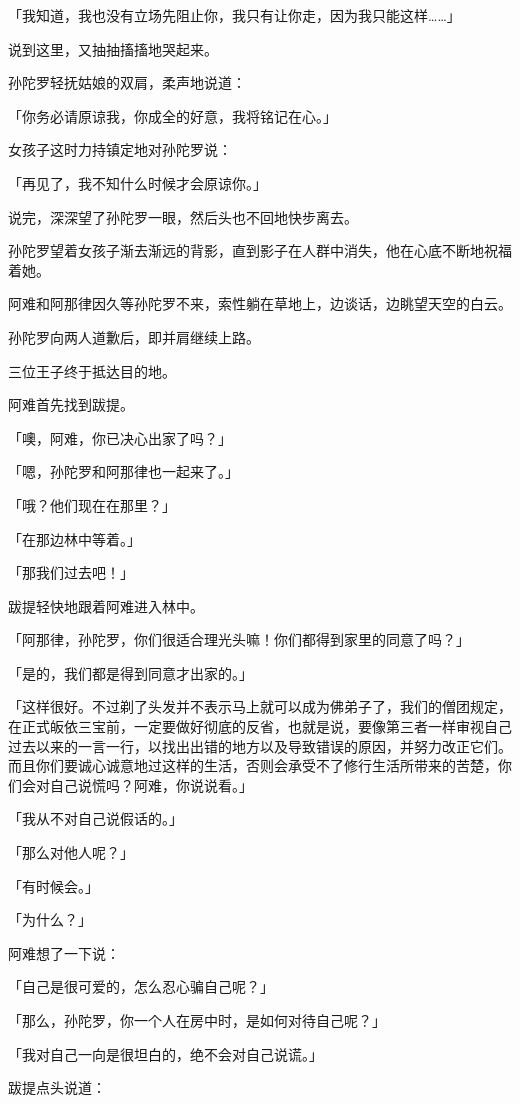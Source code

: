\documentclass[twoside,openany]{book}
\begin{document}
「我知道，我也没有立场先阻止你，我只有让你走，因为我只能这样……」

说到这里，又抽抽搐搐地哭起来。

孙陀罗轻抚姑娘的双肩，柔声地说道：

「你务必请原谅我，你成全的好意，我将铭记在心。」

女孩子这时力持镇定地对孙陀罗说：

「再见了，我不知什么时候才会原谅你。」

说完，深深望了孙陀罗一眼，然后头也不回地快步离去。

孙陀罗望着女孩子渐去渐远的背影，直到影子在人群中消失，他在心底不断地祝福着她。

阿难和阿那律因久等孙陀罗不来，索性躺在草地上，边谈话，边眺望天空的白云。

孙陀罗向两人道歉后，即并肩继续上路。

三位王子终于抵达目的地。

阿难首先找到跋提。

「噢，阿难，你已决心出家了吗？」

「嗯，孙陀罗和阿那律也一起来了。」

「哦？他们现在在那里？」

「在那边林中等着。」

「那我们过去吧！」

跋提轻快地跟着阿难进入林中。

「阿那律，孙陀罗，你们很适合理光头嘛！你们都得到家里的同意了吗？」

「是的，我们都是得到同意才出家的。」

「这样很好。不过剃了头发并不表示马上就可以成为佛弟子了，我们的僧团规定，在正式皈依三宝前，一定要做好彻底的反省，也就是说，要像第三者一样审视自己过去以来的一言一行，以找出出错的地方以及导致错误的原因，并努力改正它们。而且你们要诚心诚意地过这样的生活，否则会承受不了修行生活所带来的苦楚，你们会对自己说慌吗？阿难，你说说看。」

「我从不对自己说假话的。」

「那么对他人呢？」

「有时候会。」

「为什么？」

阿难想了一下说：

「自己是很可爱的，怎么忍心骗自己呢？」

「那么，孙陀罗，你一个人在房中时，是如何对待自己呢？」

「我对自己一向是很坦白的，绝不会对自己说谎。」

跋提点头说道：
\end{document}
